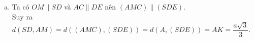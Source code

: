 \begin{vd}
{\begin{enumerate}[a)]
	$\Rightarrow d(AC, SD) = d(AC, (SDE)) = d(A, (SDE))$.\\
	Trong mặt phẳng $(ABCD)$, kẻ $AI \perp DE$ tại $I$, ta có $\heva{&DE \perp AI\\ &DE \perp SA}$ $\Rightarrow DE \perp (SAI)$.\\
	$\Rightarrow (SDE) \perp (SAI)$ theo giao tuyến $SI$.\\
	Trong mặt phẳng $(SAI)$, kẻ $AK \perp SI$ tại $K$, ta có: $AK \perp (SDE)$ $\Rightarrow AK = d(A, (SDE))$.\\
	Ta có $AIDO$ là hình bình hành nên $AI = OD = \dfrac{a\sqrt{2}}{2}$.\\
	Trong tam giác vuông $SAI$ ta có: $\dfrac{1}{AK^2} = \dfrac{1}{AI^2} + \dfrac{1}{SA^2} = \dfrac{2}{a^2} + \dfrac{1}{a^2} = \dfrac{3}{a^2}$.\\
	Suy ra $AK = \dfrac{a\sqrt{3}}{3}$.\\
	Vậy $d(AC, SD) = d(A, (SDE)) = AK = \dfrac{a\sqrt{3}}{3}$.
	\item Ta có $OM \parallel SD$ và $AC \parallel DE$ nên $(AMC) \parallel (SDE)$.\\
	Suy ra $d(SD, AM) = d((AMC), (SDE)) = d(A, (SDE)) = AK = \dfrac{a\sqrt{3}}{3}$.
	\end{enumerate}
	}
\end{vd}
